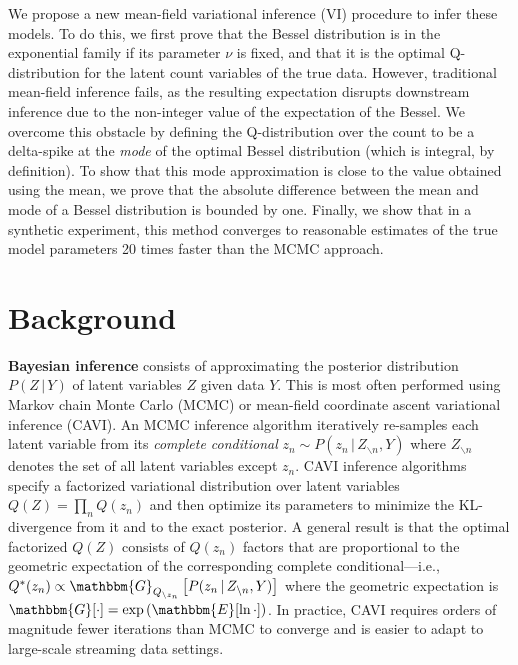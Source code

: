 \documentclass{article}
\newcommand{\Gqnot}[2]{\mathbbm{G}_{Q_{\backslash #1}}\left[#2\right]}
\begin{document}
  We propose a new mean-field variational inference (VI) procedure to infer
  these models. To do this, we first prove that the Bessel distribution is in
  the exponential family if its parameter $\nu$ is fixed, and that it is the
  optimal Q-distribution for the latent count variables of the true data.
  However, traditional mean-field inference fails, as the resulting expectation
  disrupts downstream inference due to the non-integer value of the expectation
  of the Bessel. We overcome this obstacle by defining the Q-distribution over
  the count to be a delta-spike at the \emph{mode} of the optimal Bessel
  distribution (which is integral, by definition). To show that this mode
  approximation is close to the value obtained using the mean, we prove that the
  absolute difference between the mean and mode of a Bessel distribution is
  bounded by one. Finally, we show that in a synthetic experiment, this method
  converges to reasonable estimates of the true model parameters 20 times faster
  than the MCMC approach.
  
  \section{Background}
  \textbf{Bayesian inference} consists of approximating the posterior
  distribution $P(Z\,|\,Y)$ of latent variables $Z$ given data $Y$. This is
  most often performed using Markov chain Monte Carlo (MCMC) or mean-field
  coordinate ascent variational inference (CAVI). An MCMC inference algorithm
  iteratively re-samples each latent variable from its \emph{complete
  conditional} $z_n \sim P(z_n\,|\,Z_{\backslash n}, Y)$ where $Z_{\backslash
  n}$ denotes the set of all latent variables except $z_n$. CAVI inference
  algorithms specify a factorized variational distribution over latent
  variables $Q(Z) = \prod_n Q(z_n)$ and then optimize its parameters to
  minimize the KL-divergence from it and to the exact posterior. A general
  result is that the optimal factorized $Q(Z)$ consists of $Q(z_n)$ factors
  that are proportional to the geometric expectation of the corresponding
  complete conditional---i.e., $Q^*(z_n) \propto
  \Gqnot{z_n}{P(z_n\,|\,Z_{\backslash n}, Y)}$ where the geometric expectation
  is $\mathbbm{G}[\cdot]=\exp\left(\mathbbm{E}[\ln \cdot]\right)$. In
  practice, CAVI requires orders of magnitude fewer iterations than MCMC to
  converge and is easier to adapt to large-scale streaming data settings.
  
\end{document}
